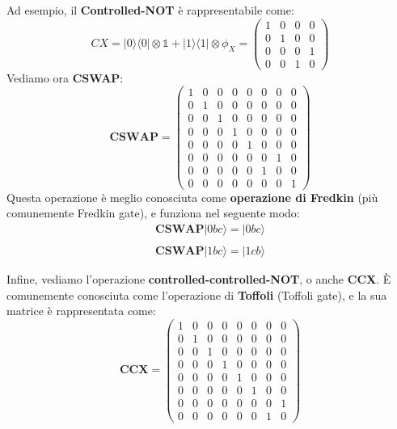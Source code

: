 \begin{itemize}
Ad esempio, il \textbf{Controlled-NOT} è rappresentabile come:
\begin{equation*}
    CX = |0\rangle\langle0| \otimes \mathbb{1} + |1\rangle\langle1| \otimes \phi_X = \left(\begin{array}{cccc}
        1 & 0 & 0 & 0 \\
        0 & 1 & 0 & 0 \\
        0 & 0 & 0 & 1 \\
        0 & 0 & 1 & 0 
    \end{array}\right)
\end{equation*}
Vediamo ora \textbf{CSWAP}:
\begin{equation*}
    \textbf{CSWAP} = \left(\begin{array}{cccccccc}
         1 & 0 & 0 & 0 & 0 & 0 & 0 & 0   \\
         0 & 1 & 0 & 0 & 0 & 0 & 0 & 0   \\
         0 & 0 & 1 & 0 & 0 & 0 & 0 & 0   \\
         0 & 0 & 0 & 1 & 0 & 0 & 0 & 0   \\
         0 & 0 & 0 & 0 & 1 & 0 & 0 & 0   \\
         0 & 0 & 0 & 0 & 0 & 0 & 1 & 0   \\
         0 & 0 & 0 & 0 & 0 & 1 & 0 & 0   \\
         0 & 0 & 0 & 0 & 0 & 0 & 0 & 1   
    \end{array}\right)
\end{equation*}
Questa operazione è meglio conosciuta come \textbf{operazione di Fredkin} (più comunemente Fredkin gate), e funziona nel seguente modo:
\begin{equation*}
    \begin{array}{c}
         \textbf{CSWAP}|0bc\rangle = |0bc\rangle  \\ \\
         \textbf{CSWAP}|1bc\rangle = |1cb\rangle 
    \end{array}
\end{equation*}

Infine, vediamo l'operazione \textbf{controlled-controlled-NOT}, o anche \textbf{CCX}. È comunemente conosciuta come l'operazione di \textbf{Toffoli} (Toffoli gate), e la sua matrice è rappresentata come:
\begin{equation*}
    \textbf{CCX} = \left(\begin{array}{cccccccc}
         1 & 0 & 0 & 0 & 0 & 0 & 0 & 0   \\
         0 & 1 & 0 & 0 & 0 & 0 & 0 & 0   \\
         0 & 0 & 1 & 0 & 0 & 0 & 0 & 0   \\
         0 & 0 & 0 & 1 & 0 & 0 & 0 & 0   \\
         0 & 0 & 0 & 0 & 1 & 0 & 0 & 0   \\
         0 & 0 & 0 & 0 & 0 & 1 & 0 & 0   \\
         0 & 0 & 0 & 0 & 0 & 0 & 0 & 1   \\
         0 & 0 & 0 & 0 & 0 & 0 & 1 & 0   
    \end{array}\right)
\end{equation*}
\end{itemize} 
